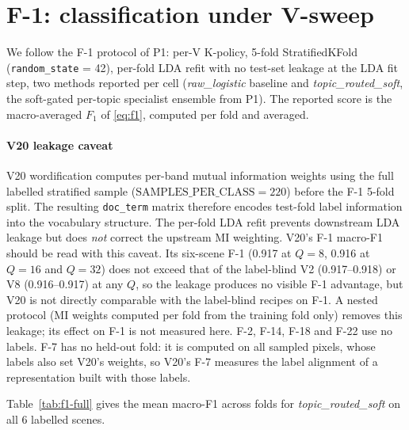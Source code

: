 \documentclass[journal,a4paper,10pt]{IEEEtran}
\begin{document}
\section{F-1: classification under V-sweep}\label{sec:results}

We follow the F-1 protocol of P1: per-V K-policy, 5-fold
StratifiedKFold (\texttt{random\_state} = 42), per-fold LDA refit with no
test-set leakage at the LDA fit step, two methods reported per cell
(\emph{raw\_logistic} baseline and \emph{topic\_routed\_soft}, the
soft-gated per-topic specialist ensemble from P1). The reported score
is the macro-averaged $F_1$ of \eqref{eq:f1}, computed per fold and
averaged.

\paragraph{V20 leakage caveat} V20 wordification computes per-band
mutual information weights using the full labelled stratified sample
($\text{SAMPLES\_PER\_CLASS} = 220$) before the F-1 5-fold split. The
resulting \texttt{doc\_term} matrix therefore encodes test-fold label
information into the vocabulary structure. The per-fold LDA refit
prevents downstream LDA leakage but does \emph{not} correct the upstream
MI weighting. V20's F-1 macro-F1 should be read with this caveat. Its
six-scene F-1 (0.917 at $Q=8$, 0.916 at $Q=16$ and $Q=32$) does not
exceed that of the label-blind V2 (0.917--0.918) or V8 (0.916--0.917)
at any $Q$, so the leakage produces no visible F-1 advantage, but V20
is not directly comparable with the label-blind recipes on F-1. A
nested protocol (MI weights computed per fold from the training fold
only) removes this leakage; its effect on F-1 is not measured here.
F-2, F-14, F-18 and F-22 use no labels. F-7 has no held-out fold: it is
computed on all sampled pixels, whose labels also set V20's weights, so
V20's F-7 measures the label alignment of a representation built with
those labels.

Table~\ref{tab:f1-full} gives the mean macro-F1 across folds for
\emph{topic\_routed\_soft} on all 6 labelled scenes.
\end{document}
